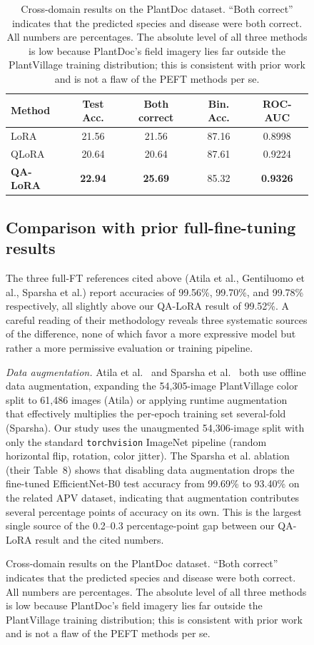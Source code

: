 \documentclass[conference]{IEEEtran}
\begin{document}
\begin{figure}[htbp]
\begin{table}[htbp]
\caption{Cross-domain results on the PlantDoc dataset. ``Both correct'' indicates that the predicted species and disease were both correct. All numbers are percentages. The absolute level of all three methods is low because PlantDoc's field imagery lies far outside the PlantVillage training distribution; this is consistent with prior work and is not a flaw of the PEFT methods per se.}
\begin{center}
\begin{tabular}{|l|c|c|c|c|}
\hline
\textbf{Method} & \textbf{Test Acc.} & \textbf{Both correct} & \textbf{Bin. Acc.} & \textbf{ROC-AUC} \\
\hline
LoRA     & 21.56 & 21.56 & 87.16 & 0.8998 \\
QLoRA    & 20.64 & 20.64 & 87.61 & 0.9224 \\
\textbf{QA-LoRA} & \textbf{22.94} & \textbf{25.69} & 85.32 & \textbf{0.9326} \\
\hline
\end{tabular}
\label{tab:plantdoc}
\end{center}
\end{table}

\subsection{Comparison with prior full-fine-tuning results}
The three full-FT references cited above (Atila et al., Gentiluomo et al., Sparsha et al.) report accuracies of 99.56\%, 99.70\%, and 99.78\% respectively, all slightly above our QA-LoRA result of 99.52\%. A careful reading of their methodology reveals three systematic sources of the difference, none of which favor a more expressive model but rather a more permissive evaluation or training pipeline.

\textit{Data augmentation.} Atila et al.~\cite{atila2021} and Sparsha et al.~\cite{sparsha2025} both use offline data augmentation, expanding the 54{,}305-image PlantVillage color split to 61{,}486 images (Atila) or applying runtime augmentation that effectively multiplies the per-epoch training set several-fold (Sparsha). Our study uses the unaugmented 54{,}306-image split with only the standard \texttt{torchvision} ImageNet pipeline (random horizontal flip, rotation, color jitter). The Sparsha et al. ablation (their Table~8) shows that disabling data augmentation drops the fine-tuned EfficientNet-B0 test accuracy from 99.69\% to 93.40\% on the related APV dataset, indicating that augmentation contributes several percentage points of accuracy on its own. This is the largest single source of the 0.2--0.3 percentage-point gap between our QA-LoRA result and the cited numbers.


\end{figure}
\end{document}
